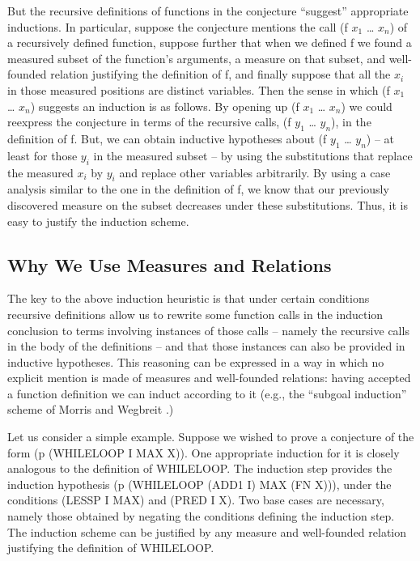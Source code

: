 \documentclass[11pt]{book}
\newcommand{\pubdefaulttextsize}{\large}
\begin{document}
But the recursive definitions
of functions in the conjecture ``suggest'' appropriate inductions.
In particular, suppose the conjecture mentions the call
(f $x_{1}$ \ldots{} $x_{n}$) of a recursively defined function, suppose further that
when we defined f we found a measured subset of the function's arguments,
a measure on that subset, and well-founded
relation justifying the definition of f, and finally suppose that all the $x_{i}$
in those measured positions are distinct variables.
Then the sense in which (f $x_{1}$ \ldots{} $x_{n}$) suggests an induction is
as follows.  By opening up (f $x_{1}$ \ldots{} $x_{n}$) we could reexpress the
conjecture in terms of the recursive calls, (f $y_{1}$ \ldots{} $y_{n}$), in
the definition of f.  But, we can obtain inductive hypotheses
about (f $y_{1}$ \ldots{} $y_{n}$)  -- at least
for those $y_{i}$ in the measured subset -- by using the substitutions that
replace the measured $x_{i}$ by $y_{i}$ and replace other variables arbitrarily.
By using a case analysis similar to the one in the definition of f, we
know that our previously discovered measure on the subset
decreases under these substitutions.  Thus, it is easy to
justify the induction scheme.
\subsection{Why We Use Measures and Relations}
\pubdefaulttextsize
The key to the above induction heuristic is that under certain
conditions  recursive definitions
allow us to rewrite some function calls in the induction
conclusion to terms involving instances of those calls -- namely the recursive
calls in the body of the definitions -- and that
those instances can also be provided in inductive hypotheses.
This reasoning can be expressed in a way in which no explicit
mention is made of measures and well-founded relations:
having accepted a function definition we can induct according
to it (e.g., the ``subgoal induction'' scheme
of Morris and Wegbreit \cite{MORRIS}.)

Let us consider a simple example.  Suppose we wished to
prove a conjecture of the form (p (WHILELOOP I MAX X)).  One appropriate
induction for it is closely analogous to the definition of WHILELOOP.
The induction step provides the induction hypothesis
(p (WHILELOOP (ADD1 I) MAX (FN X))), under the conditions (LESSP I MAX)
and (PRED I X).  Two base cases are necessary, namely those obtained
by negating the conditions defining the induction step.
The induction scheme can be justified by any measure
and well-founded relation justifying the definition of WHILELOOP.
\end{document}

